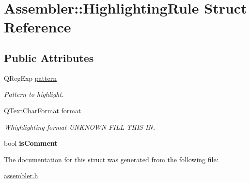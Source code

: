 \hypertarget{struct_assembler_1_1_highlighting_rule}{}\section{Assembler\+:\+:Highlighting\+Rule Struct Reference}
\label{struct_assembler_1_1_highlighting_rule}
\subsection*{Public Attributes}
\begin{DoxyCompactItemize}
\item 
\hypertarget{struct_assembler_1_1_highlighting_rule_aa3ba772c482811abece37b73b007eef3}{}Q\+Reg\+Exp \hyperlink{struct_assembler_1_1_highlighting_rule_aa3ba772c482811abece37b73b007eef3}{pattern}\label{struct_assembler_1_1_highlighting_rule_aa3ba772c482811abece37b73b007eef3}

\begin{DoxyCompactList}\small\item\em Pattern to highlight. \end{DoxyCompactList}\item 
\hypertarget{struct_assembler_1_1_highlighting_rule_ac31c4c54be807ed0c1cebf5478316bc3}{}Q\+Text\+Char\+Format \hyperlink{struct_assembler_1_1_highlighting_rule_ac31c4c54be807ed0c1cebf5478316bc3}{format}\label{struct_assembler_1_1_highlighting_rule_ac31c4c54be807ed0c1cebf5478316bc3}

\begin{DoxyCompactList}\small\item\em Whighlighting format U\+N\+K\+N\+O\+W\+N F\+I\+L\+L T\+H\+I\+S I\+N. \end{DoxyCompactList}\item 
\hypertarget{struct_assembler_1_1_highlighting_rule_acec02296231600d74137df651f987808}{}bool {\bfseries is\+Comment}\label{struct_assembler_1_1_highlighting_rule_acec02296231600d74137df651f987808}

\end{DoxyCompactItemize}


The documentation for this struct was generated from the following file\+:\begin{DoxyCompactItemize}
\item 
\hyperlink{assembler_8h}{assembler.\+h}\end{DoxyCompactItemize}
